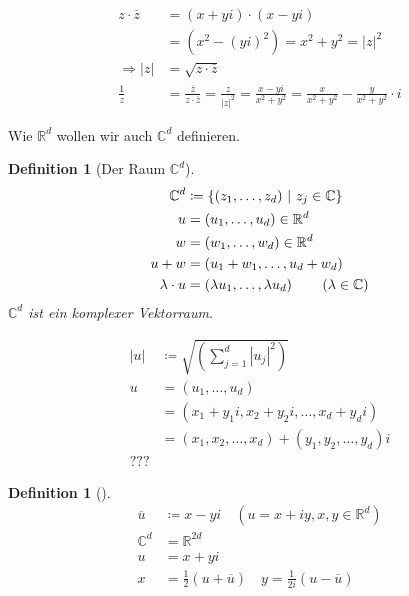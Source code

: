 \documentclass[11pt, twoside, a4paper]{article}
\theoremstyle{plain}
\newtheorem{definition}[blockelement]{Definition}
\newcommand{\set}[1]{\left\{#1\right\}}
\newcommand{\pair}[1]{\left(#1\right)}
\newcommand{\abs}[1]{\left|#1\right|}
\newcommand{\impl}[0]{\Rightarrow{}}
\newcommand{\definedas}[0]{\coloneqq}
\newcommand{\R}{\mathbb{R}}
\newcommand{\C}{\mathbb{C}}
\begin{document}
    \begin{align*}
        z\cdot\overline{z} &= (x+yi) \cdot (x-yi)\\
        &= (x^2-(yi)^2) = x^2+y^2 = \abs{z}^2\\
        \impl \abs{z} &= \sqrt{z\cdot\overline{z}}\\
        \frac{1}{z} &= \frac{\overline{z}}{z\cdot\overline{z}} = \frac{z}{\abs{z}^2} = \frac{x-yi}{x^2+y^2} = \frac{x}{x^2+y^2} - \frac{y}{x^2+y^2}\cdot i
    \end{align*}

    \newpage


    \marginnote{[21. Dez]}

    Wie $\R^d$ wollen wir auch $\C^d$ definieren.

    \begin{definition}[Der Raum $\C^d$]
        \begin{align*}
            \C^d &\definedas \set{\pair{z_1, \dots, z_d} ~\middle | ~ z_j \in\C}\\
            u &= \pair{u_1, \dots, u_d} \in\R^d\\
            w &= \pair{w_1, \dots, w_d} \in\R^d\\
            u+w &= \pair{u_1+w_1,\dots,u_d+w_d}\\
            \lambda\cdot u &= \pair{\lambda u_1,\dots,\lambda u_d}\tag{$\lambda\in\C$}
        \end{align*}
        $\C^d$ ist ein komplexer Vektorraum.

        \begin{align*}
            \abs{u} &\definedas \sqrt{\pair{\sum_{j=1}^{d} \abs{u_j}^2}}\tag{Euklidische Länge}\\
            u &= \pair{u_1, \dots, u_d}\\
            &= \pair{x_1+y_1i, x_2 + y_2 i,\dots, x_d + y_d i}\\
            &= \pair{x_1, x_2,\dots,x_d} + \pair{y_1,y_2,\dots,y_d}i\\
            ???
        \end{align*}
    \end{definition}

    \begin{definition}[]
        \begin{align*}
            \overline{u} &\definedas x - yi\quad (u=x+iy, x,y\in\R^d)\\
            \C^d &= \R^{2d}\\[10pt]
            u &= x + yi\\
            x &= \frac{1}{2}\pair{u+\overline{u}}\quad y = \frac{1}{2i}\pair{u-\overline{u}}
        \end{align*}
    \end{definition}
\end{document}
